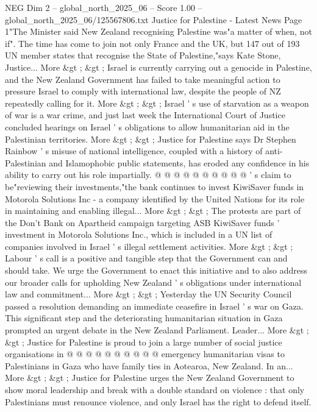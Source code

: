 \begin{textsample}{NEG Dim 2 – global\_north\_2025\_06 – Score 1.00 – global\_north\_2025\_06/125567806.txt}  \label{ex:f2_neg_089}
Justice for Palestine - Latest News Page 1"The Minister said New Zealand recognising Palestine was"a matter of when, not if".
The time has come to join not only France and the UK, but 147 out of 193 UN member states that recognise the State of Palestine,"says Kate Stone, Justice...
More \&gt ; \&gt ; Israel is currently carrying out a genocide in Palestine, and the New Zealand Government has failed to take meaningful action to pressure Israel to comply with international law, despite the people of NZ repeatedly calling for it.
More \&gt ; \&gt ; Israel ' s use of starvation as a weapon of war is a war crime, and just last week the International Court of Justice concluded hearings on Israel ' s obligations to allow humanitarian aid in the Palestinian territories.
More \&gt ; \&gt ; Justice for Palestine says Dr Stephen Rainbow ' s misuse of national intelligence, coupled with a history of anti-Palestinian and Islamophobic public statements, has eroded any confidence in his ability to carry out his role impartially. @ @ @ @ @ @ @ @ @ @ ' s claim to be"reviewing their investments,"the bank continues to invest KiwiSaver funds in Motorola Solutions Inc - a company identified by the United Nations for its role in maintaining and enabling illegal...
More \&gt ; \&gt ; The protests are part of the Don't Bank on Apartheid campaign targeting ASB KiwiSaver funds ' investment in Motorola Solutions Inc., which is included in a UN list of companies involved in Israel ' s illegal settlement activities.
More \&gt ; \&gt ; Labour ' s call is a positive and tangible step that the Government can and should take.
We urge the Government to enact this initiative and to also address our broader calls for upholding New Zealand ' s obligations under international law and commitment...
More \&gt ; \&gt ; Yesterday the UN Security Council passed a resolution demanding an immediate ceasefire in Israel ' s war on Gaza.
This significant step and the deteriorating humanitarian situation in Gaza prompted an urgent debate in the New Zealand Parliament.
Leader...
More \&gt ; \&gt ; Justice for Palestine is proud to join a large number of social justice organisations in @ @ @ @ @ @ @ @ @ @ emergency humanitarian visas to Palestinians in Gaza who have family ties in Aotearoa, New Zealand.
In an...
More \&gt ; \&gt ; Justice for Palestine urges the New Zealand Government to show moral leadership and break with a double standard on violence : that only Palestinians must renounce violence, and only Israel has the right to defend itself.

\end{textsample}
